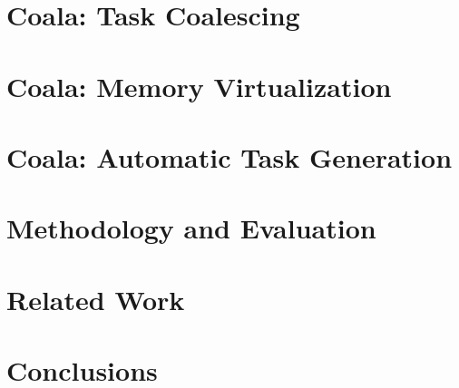 \documentclass[sigplan,10pt,review,anonymous]{acmart}
\newcommand{\sys}{Coala\xspace}
\begin{document}


\section{\sys: Task Coalescing}
\label{sec:task_coalescing}



\section{\sys: Memory Virtualization}
\label{sec:memory_virtulaization}



\section{\sys: Automatic Task Generation}
\label{sec:compiler}




%

\section{Methodology and Evaluation}
\label{sec:methodology_evaluation}



\section{Related Work}
\label{sec:related_work}



\section{Conclusions}
\label{sec:conclusions}




%

\end{document}
